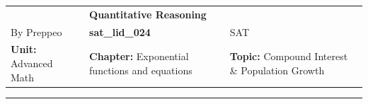 \documentclass[11pt,paper=a4,answers]{exam}
\begin{document}
\begin{center}
    \centering
    \renewcommand{\arraystretch}{1.5}
    \begin{tabularx}{\textwidth}{YYY}
    & \normalsize\bf{{\Large{{Quantitative Reasoning}}}} & \\
    By Preppeo & \normalsize\bf{{sat\_lid\_024}} & SAT\\
    \normalsize{{\textbf{{Unit:}} Advanced Math}} & \normalsize{{\textbf{{Chapter:}} Exponential functions and equations}} & \normalsize{{\textbf{{Topic:}} Compound Interest \& Population Growth}} \\
    \end{tabularx}
\end{center}
\par\noindent\rule{\textwidth}{1pt}
\end{document}
